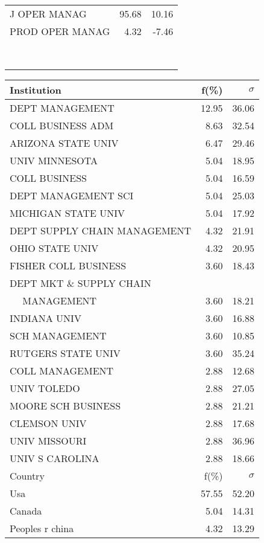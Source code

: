\documentclass[a4paper,11pt]{report}
\begin{document}
\begin{landscape}
\begin{table}[!ht]
{\begin{tabular}{|l r  r|}
\hline
J OPER MANAG & 95.68 & 10.16\\
PROD OPER MANAG & 4.32 & -7.46\\
 &  & \\
 &  & \\
 &  & \\
 &  & \\
 &  & \\
 &  & \\
 &  & \\
 &  & \\
\hline
\end{tabular}
}
{\scriptsize\begin{tabular}{|l r r|}
\hline
Institution & f(\%) & $\sigma$\\
\hline
DEPT MANAGEMENT & 12.95 & 36.06\\
COLL BUSINESS ADM & 8.63 & 32.54\\
ARIZONA STATE UNIV & 6.47 & 29.46\\
UNIV MINNESOTA & 5.04 & 18.95\\
COLL BUSINESS & 5.04 & 16.59\\
DEPT MANAGEMENT SCI & 5.04 & 25.03\\
MICHIGAN STATE UNIV & 5.04 & 17.92\\
DEPT SUPPLY CHAIN MANAGEMENT & 4.32 & 21.91\\
OHIO STATE UNIV & 4.32 & 20.95\\
FISHER COLL BUSINESS & 3.60 & 18.43\\
DEPT MKT \& SUPPLY CHAIN &  & \\
$\quad$ MANAGEMENT & 3.60 & 18.21\\
INDIANA UNIV & 3.60 & 16.88\\
SCH MANAGEMENT & 3.60 & 10.85\\
RUTGERS STATE UNIV & 3.60 & 35.24\\
COLL MANAGEMENT & 2.88 & 12.68\\
UNIV TOLEDO & 2.88 & 27.05\\
MOORE SCH BUSINESS & 2.88 & 21.21\\
CLEMSON UNIV & 2.88 & 17.68\\
UNIV MISSOURI & 2.88 & 36.96\\
UNIV S CAROLINA & 2.88 & 18.66\\
\hline
\hline
Country & f(\%) & $\sigma$\\
\hline
Usa & 57.55 & 52.20\\
Canada & 5.04 & 14.31\\
Peoples r china & 4.32 & 13.29\\

\end{tabular}}
\end{table}
\end{landscape}
\end{document}
